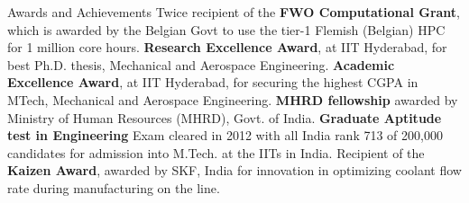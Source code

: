 \begin{rubric}{Awards and Achievements}
\entry*[2023, 2022] Twice recipient of the \textbf{FWO Computational Grant}, 
 which is awarded by the Belgian Govt to use the tier-1 Flemish (Belgian) HPC 
 for 1 million core hours.
%
\entry*[2020] \textbf{Research Excellence Award}, at IIT Hyderabad, for best Ph.D. thesis, Mechanical and Aerospace Engineering.
\entry*[2013] \textbf{Academic Excellence Award}, at IIT Hyderabad, for securing the highest CGPA in MTech, Mechanical and Aerospace Engineering.
\entry*[2012-2020] \textbf{MHRD fellowship} awarded by Ministry of Human Resources (MHRD), Govt. of India.
\entry*[2012] \textbf{Graduate Aptitude test in Engineering} Exam cleared in 2012 with all India rank 713 of 200,000 candidates for admission into M.Tech. at the IITs in India.
\entry*[2011] Recipient of the \textbf{Kaizen Award}, awarded by SKF, India for innovation in optimizing coolant flow rate during manufacturing on the line.
\end{rubric}